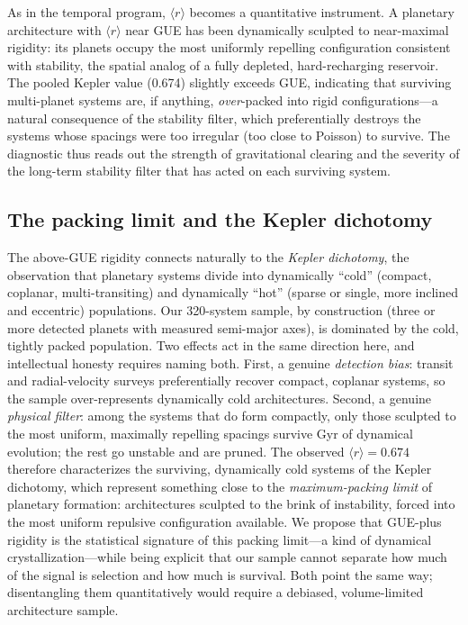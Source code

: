 \documentclass[12pt,a4paper]{article}
\begin{document}
As in the temporal program, $\langle r\rangle$ becomes a quantitative instrument. A planetary architecture with $\langle r\rangle$ near GUE has been dynamically sculpted to near-maximal rigidity: its planets occupy the most uniformly repelling configuration consistent with stability, the spatial analog of a fully depleted, hard-recharging reservoir. The pooled Kepler value (0.674) slightly exceeds GUE, indicating that surviving multi-planet systems are, if anything, \emph{over}-packed into rigid configurations---a natural consequence of the stability filter, which preferentially destroys the systems whose spacings were too irregular (too close to Poisson) to survive. The diagnostic thus reads out the strength of gravitational clearing and the severity of the long-term stability filter that has acted on each surviving system.

\subsection{The packing limit and the Kepler dichotomy}

The above-GUE rigidity connects naturally to the \emph{Kepler dichotomy}, the observation that planetary systems divide into dynamically ``cold'' (compact, coplanar, multi-transiting) and dynamically ``hot'' (sparse or single, more inclined and eccentric) populations. Our 320-system sample, by construction (three or more detected planets with measured semi-major axes), is dominated by the cold, tightly packed population. Two effects act in the same direction here, and intellectual honesty requires naming both. First, a genuine \emph{detection bias}: transit and radial-velocity surveys preferentially recover compact, coplanar systems, so the sample over-represents dynamically cold architectures. Second, a genuine \emph{physical filter}: among the systems that do form compactly, only those sculpted to the most uniform, maximally repelling spacings survive Gyr of dynamical evolution; the rest go unstable and are pruned. The observed $\langle r\rangle=0.674$ therefore characterizes the surviving, dynamically cold systems of the Kepler dichotomy, which represent something close to the \emph{maximum-packing limit} of planetary formation: architectures sculpted to the brink of instability, forced into the most uniform repulsive configuration available. We propose that GUE-plus rigidity is the statistical signature of this packing limit---a kind of dynamical crystallization---while being explicit that our sample cannot separate how much of the signal is selection and how much is survival. Both point the same way; disentangling them quantitatively would require a debiased, volume-limited architecture sample.
\end{document}
